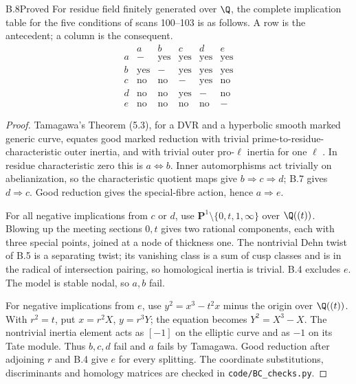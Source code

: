 \begin{claim}{B.8}{Proved}
For residue field finitely generated over $\Q$, the complete implication
table for the five conditions of scans 100--103 is as follows. A row is the
antecedent; a column is the consequent.
\[
\begin{array}{c|ccccc}
 &a&b&c&d&e\\\hline
a&-&\mathrm{yes}&\mathrm{yes}&\mathrm{yes}&\mathrm{yes}\\
b&\mathrm{yes}&-&\mathrm{yes}&\mathrm{yes}&\mathrm{yes}\\
c&\mathrm{no}&\mathrm{no}&-&\mathrm{yes}&\mathrm{no}\\
d&\mathrm{no}&\mathrm{no}&\mathrm{yes}&-&\mathrm{no}\\
e&\mathrm{no}&\mathrm{no}&\mathrm{no}&\mathrm{no}&-
\end{array}
\]
\end{claim}
\begin{proof}
Tamagawa's Theorem (5.3), for a DVR and a hyperbolic smooth marked generic
curve, equates good marked reduction with trivial prime-to-residue-characteristic
outer inertia, and with trivial outer pro-$\ell$ inertia for one $\ell$
\citep[Theorem (5.3)]{BC_Tamagawa}. In residue characteristic zero this is
$a\Leftrightarrow b$. Inner automorphisms act trivially on abelianization,
so the characteristic quotient maps give $b\Rightarrow c\Rightarrow d$;
B.7 gives $d\Rightarrow c$. Good reduction gives the special-fibre action,
hence $a\Rightarrow e$.

For all negative implications from $c$ or $d$, use
$\mathbf P^1\setminus\{0,t,1,\infty\}$ over $\Q((t))$. Blowing up the
meeting sections $0,t$ gives two rational components, each with three special
points, joined at a node of thickness one. The nontrivial Dehn twist of B.5
is a separating twist; its vanishing class is a sum of cusp classes and is
in the radical of intersection pairing, so homological inertia is trivial.
B.4 excludes $e$. The model is stable nodal, so $a,b$ fail.

For negative implications from $e$, use
$y^2=x^3-t^2x$ minus the origin over $\Q((t))$. With $r^2=t$, put
$x=r^2X$, $y=r^3Y$; the equation becomes $Y^2=X^3-X$.
The nontrivial inertia element acts as $[-1]$ on the elliptic curve and
as $-1$ on its Tate module. Thus $b,c,d$ fail and $a$ fails by Tamagawa.
Good reduction after adjoining $r$ and B.4 give $e$ for every splitting.
The coordinate substitutions, discriminants and homology matrices are
checked in \texttt{code/BC\_checks.py}.
\end{proof}

